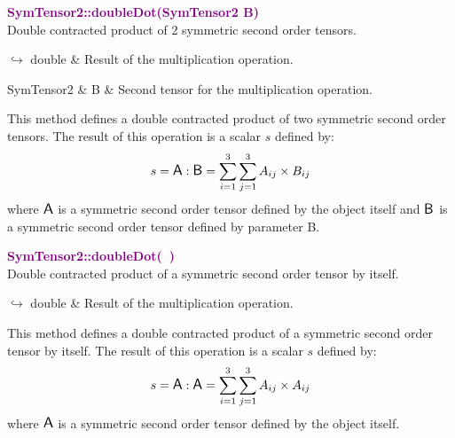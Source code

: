 \textcolor{purple}{\textbf{SymTensor2::doubleDot(SymTensor2 B)}}\label{SymTensor2::doubleDot(SymTensor2 B)}\\
Double contracted product of 2 symmetric second order tensors.\vspace*{-0.5em}
\begin{tcolorbox}[grow to left by=-1cm, width=\textwidth-1cm,myArgs,tabularx={l|R}]
$\hookrightarrow$ double & Result of the multiplication operation.
\end{tcolorbox}

\begin{tcolorbox}[width=\textwidth,myArgs,tabularx={ll|R}]
SymTensor2 & B & Second tensor for the multiplication operation.
\end{tcolorbox}

This method defines a double contracted product of two symmetric second order tensors.
The result of this operation is a scalar $s$ defined by:
\begin{equation*}
s = \mbox{\large\ensuremath{\mathsf{A}}} : \mbox{\large\ensuremath{\mathsf{B}}} = \sum_{i=1}^{3} \sum_{j=1}^{3} A_{ij}\times B_{ij}
\end{equation*}
where $\mbox{\large\ensuremath{\mathsf{A}}}$ is a symmetric second order tensor defined by the object itself and $\mbox{\large\ensuremath{\mathsf{B}}}$ is a symmetric second order tensor defined by parameter B.

\textcolor{purple}{\textbf{SymTensor2::doubleDot(~)}}\label{SymTensor2::doubleDot()}\\
Double contracted product of a symmetric second order tensor by itself.\vspace*{-0.5em}
\begin{tcolorbox}[grow to left by=-1cm, width=\textwidth-1cm,myArgs,tabularx={l|R}]
$\hookrightarrow$ double & Result of the multiplication operation.
\end{tcolorbox}

This method defines a double contracted product of a symmetric second order tensor by itself.
The result of this operation is a scalar $s$ defined by:
\begin{equation*}
s = \mbox{\large\ensuremath{\mathsf{A}}} : \mbox{\large\ensuremath{\mathsf{A}}} = \sum_{i=1}^{3} \sum_{j=1}^{3} A_{ij}\times A_{ij}
\end{equation*}
where $\mbox{\large\ensuremath{\mathsf{A}}}$ is a symmetric second order tensor defined by the object itself.

